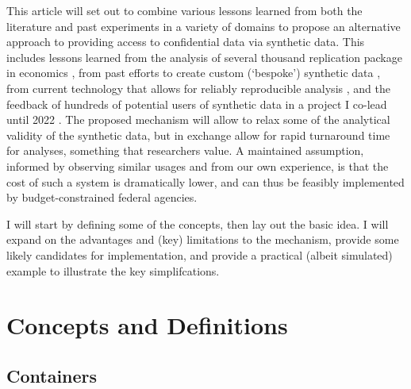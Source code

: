 \documentclass[]{hdsr}
\begin{document}
This article will set out to combine various lessons learned from both the literature and past experiments in a variety of domains to propose an alternative approach to providing access to confidential data via synthetic data. This includes lessons learned from the analysis of several thousand replication package in economics \citep{vilhuber_report_2025}, from past efforts to create custom (`bespoke') synthetic data \citep{nowok_providing_2017}, from current technology that allows for reliably reproducible analysis \citep[\textbf{containers}, see ][for an introduction]{boettiger_introduction_2015}, and the feedback of hundreds of potential users of synthetic data in a project I co-lead until 2022 \citep{vilhuber_end_2022}. The proposed mechanism will allow to relax some of the analytical validity of the synthetic data, but in exchange allow for rapid turnaround time for analyses, something that researchers value. A maintained assumption, informed by observing similar usages and from our own experience, is that the cost of such a system is dramatically lower, and can thus be feasibly implemented by budget-constrained federal agencies. 

I will start by defining some of the concepts, then lay out the basic idea. I will expand on the advantages and (key) limitations to the mechanism, provide some likely candidates for implementation, and provide a practical (albeit simulated) example to illustrate the key simplifcations.

\section{Concepts and Definitions}

\subsection{Containers}
\end{document}
